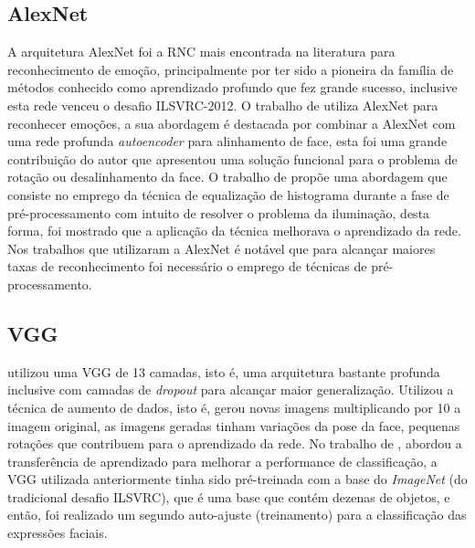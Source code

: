 \subsection{AlexNet}
A arquitetura AlexNet foi a RNC mais encontrada na literatura para reconhecimento de emoção, principalmente por ter sido a pioneira da família de métodos conhecido como aprendizado profundo que fez grande sucesso, inclusive esta rede venceu o desafio ILSVRC-2012. O trabalho de \cite{art4} utiliza AlexNet para reconhecer emoções, a sua abordagem é destacada por combinar a AlexNet com uma rede profunda \textit{autoencoder} para alinhamento de face, esta foi uma grande contribuição do autor que apresentou uma solução funcional para o problema de rotação ou desalinhamento da face. O trabalho de \cite{art2} propõe uma abordagem que consiste no emprego da técnica de equalização de histograma durante a fase de pré-processamento com intuito de resolver o problema da iluminação, desta forma, foi mostrado que a aplicação da técnica melhorava o aprendizado da rede. Nos trabalhos que utilizaram a AlexNet é notável que para alcançar maiores taxas de reconhecimento foi necessário o emprego de técnicas de pré-processamento. 

\subsection{VGG}
\cite{art8} utilizou uma VGG de 13 camadas, isto é, uma arquitetura bastante profunda inclusive com camadas de \textit{dropout} para alcançar maior generalização. Utilizou a técnica de aumento de dados, isto é, gerou novas imagens multiplicando por 10 a imagem original, as imagens geradas tinham variações da pose da face, pequenas rotações que contribuem para o aprendizado da rede. No trabalho de \cite{art13}, abordou a transferência de aprendizado para melhorar a performance de classificação, a VGG utilizada anteriormente tinha sido pré-treinada com a base do \textit{ImageNet} (do tradicional desafio ILSVRC), que é uma base que contém dezenas de objetos, e então, foi realizado um segundo auto-ajuste (treinamento) para a classificação das expressões faciais.

